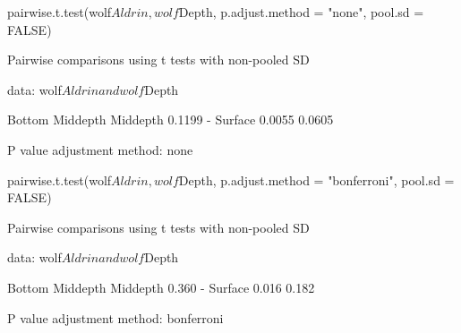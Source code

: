 \documentclass[a4paper]{article}
\begin{document}
\begin{Schunk}
\begin{Sinput}
pairwise.t.test(wolf$Aldrin, wolf$Depth, 
                p.adjust.method = "none", pool.sd = FALSE)
\end{Sinput}
\begin{Soutput}

	Pairwise comparisons using t tests with non-pooled SD 

data:  wolf$Aldrin and wolf$Depth 

         Bottom Middepth
Middepth 0.1199 -       
Surface  0.0055 0.0605  

P value adjustment method: none 
\end{Soutput}
\begin{Sinput}
pairwise.t.test(wolf$Aldrin, wolf$Depth,
                p.adjust.method = "bonferroni", pool.sd = FALSE)
\end{Sinput}
\begin{Soutput}

	Pairwise comparisons using t tests with non-pooled SD 

data:  wolf$Aldrin and wolf$Depth 

         Bottom Middepth
Middepth 0.360  -       
Surface  0.016  0.182   

P value adjustment method: bonferroni 
\end{Soutput}
\end{Schunk}
\end{document}
